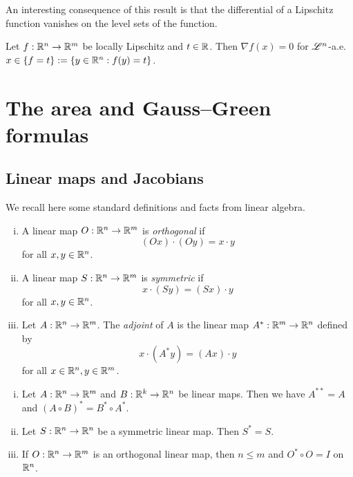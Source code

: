 An interesting consequence of this result is that the differential of a Lipschitz function vanishes on the level sets of the function.

\begin{theorem}
Let $f: \mathbb{R}^{n} \to \mathbb{R}^{m}$ be locally Lipschitz and $t \in \mathbb{R}$. Then $\nabla f(x) = 0$ for $\mathscr{L}^{n}$-a.e. $x \in \{ f = t\} := \{ y \in \mathbb{R}^{n}: f(y) = t\}$.
\end{theorem}

\section{The area and Gauss--Green formulas}


\subsection{Linear maps and Jacobians}

We recall here some standard definitions and facts from linear algebra.

\begin{definition} \hfill
\begin{enumerate}[i)]
\item A linear map $O : \mathbb{R}^{n} \to \mathbb{R}^{m}$ is {\em orthogonal} if $$(Ox) \cdot (Oy) = x \cdot y$$ for all $x, y \in \mathbb{R}^{n}$.
\item A linear map $S: \mathbb{R}^{n} \to \mathbb{R}^{m}$ is {\em symmetric} if $$x \cdot (Sy) = (Sx) \cdot y$$ for all $x, y \in \mathbb{R}^{n}$.
\item Let $A: \mathbb{R}^{n} \to \mathbb{R}^{m}$. The {\em adjoint} of $A$ is the linear map $A^{*}: \mathbb{R}^{m} \to \mathbb{R}^{n}$ defined by $$x \cdot (A^{*} y) = (Ax) \cdot y$$ for all $x \in \mathbb{R}^{n}, y \in \mathbb{R}^{m}$. 
\end{enumerate}
\end{definition}

\begin{proposition} \label{prop:properties_linear} \hfill
\begin{enumerate}[i)]
\item Let $A: \mathbb{R}^{n} \to \mathbb{R}^{m}$ and $B: \mathbb{R}^{k} \to \mathbb{R}^{n}$ be linear maps. Then we have $A^{**} = A$ and $(A \circ B)^{*} = B^{*} \circ A^{*}$.
\item Let $S : \mathbb{R}^{n} \to \mathbb{R}^{n}$ be a symmetric linear map. Then $S^{*} = S$.
\item If $O : \mathbb{R}^{n} \to \mathbb{R}^{m}$ is an orthogonal linear map, then $n \le m$ and $O^{*} \circ O = I$ on $\mathbb{R}^{n}$. 
\end{enumerate}
\end{proposition}


